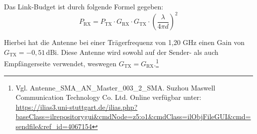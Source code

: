 Das Link-Budget ist durch folgende Formel gegeben:
\begin{equation}
    P_\text{RX} = P_\text{TX} \cdot G_\text{RX} \cdot G_\text{TX} \cdot \left(\frac{\lambda}{4\pi d}\right)^2
\end{equation}

Hierbei hat die Antenne bei einer Trägerfrequenz von 1,20 GHz einen Gain von $G_\text{TX} = -0{,}51$\,dBi. Diese Antenne wird sowohl auf der Sender- als auch Empfängerseite verwendet, weswegen $G_\text{TX} = G_\text{RX}$.\footnote{Vgl. Antenne\_SMA\_AN\_Master\_003\_2\_SMA. Suzhou Maswell Communication Technology Co. Ltd. Online verfügbar unter: \url{https://ilias3.uni-stuttgart.de/ilias.php?baseClass=ilrepositorygui&cmdNode=z5:o1&cmdClass=ilObjFileGUI&cmd=sendfile&ref_id=4067154}}

